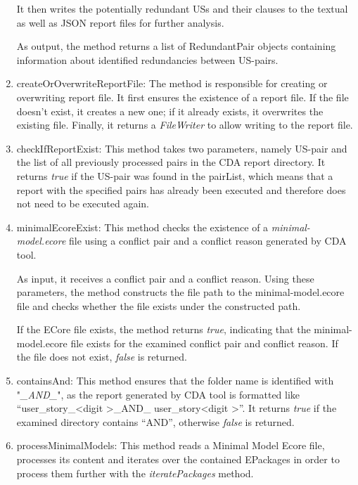 \begin{enumerate}
	It then writes the potentially redundant USs and their clauses to the textual as well as JSON report files for further analysis.
	
	As output, the method returns a list of RedundantPair objects containing information about identified redundancies between US-pairs.
	
	\item createOrOverwriteReportFile: The method is responsible for creating or overwriting report file. It first ensures the existence of a report file. If the file doesn't exist, it creates a new one; if it already exists, it overwrites the existing file. Finally, it returns a \textit{FileWriter} to allow writing to the report file.
	
	\item checkIfReportExist: This method takes two parameters, namely US-pair and the list of all previously processed pairs in the CDA report directory. It returns \textit{true} if the US-pair was found in the pairList, which means that a report with the specified pairs has already been executed and therefore does not need to be executed again.
	
	\item minimalEcoreExist: This method checks the existence of a \textit{minimal-model.ecore} file using a conflict pair and a conflict reason generated by CDA tool.
	
	As input, it receives a conflict pair and a conflict reason. Using these parameters, the method constructs the file path to the minimal-model.ecore file and checks whether the file exists under the constructed path.
	
	If the ECore file exists, the method returns \textit{true}, indicating that the minimal-model.ecore file exists for the examined conflict pair and conflict reason. If the file does not exist, \textit{false} is returned.
	
	\item containsAnd: This method ensures that the folder name is identified with "\textit{\_AND\_}", as the report generated by CDA tool is formatted like \enquote{user\_story\_\textless digit \textgreater \_AND\_ user\_story\textless digit \textgreater}. It returns \textit{true} if the examined directory contains \enquote{AND}, otherwise \textit{false} is returned.
	
	\item processMinimalModels: This method reads a Minimal Model Ecore file, processes its content and iterates over the contained EPackages in order to process them further with the \textit{iteratePackages} method. 
	

\end{enumerate}
